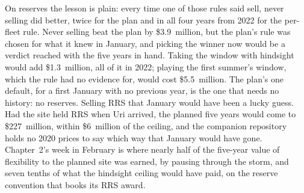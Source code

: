 On reserves the lesson is plain: every time one of those rules said sell, never selling did better, twice for the plan and in all four years from 2022 for the per-fleet rule. Never selling beat the plan by \$3.9~million, but the plan's rule was chosen for what it knew in January, and picking the winner now would be a verdict reached with the five years in hand. Taking the window with hindsight would add \$1.3~million, all of it in 2022; playing the first summer's window, which the rule had no evidence for, would cost \$5.5~million. The plan's one default, for a first January with no previous year, is the one that needs no history: no reserves. Selling RRS that January would have been a lucky guess. Had the site held RRS when Uri arrived, the planned five years would come to \$227~million, within \$6~million of the ceiling, and the companion repository holds no 2020 prices to say which way that January would have gone. %
Chapter~2's week in February is where nearly half of the five-year value of flexibility to the planned site was earned, by pausing through the storm, and seven tenths of what the hindsight ceiling would have paid, on the reserve convention that books its RRS award. %

